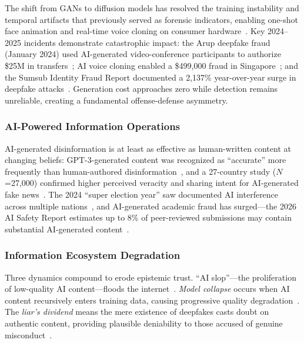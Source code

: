 The shift from GANs to diffusion models has resolved the training instability and temporal artifacts that previously served as forensic indicators, enabling one-shot face animation and real-time voice cloning on consumer hardware~\cite{pei2024deepfakesurvey}. Key 2024--2025 incidents demonstrate catastrophic impact: the Arup deepfake fraud (January 2024) used AI-generated video-conference participants to authorize \$25M in transfers~\cite{wef2025arup}; AI voice cloning enabled a \$499,000 fraud in Singapore~\cite{brightside2025phishing}; and the Sumsub Identity Fraud Report documented a 2,137\% year-over-year surge in deepfake attacks~\cite{sumsub2024}. Generation cost approaches zero while detection remains unreliable, creating a fundamental offense-defense asymmetry.


\subsubsection{AI-Powered Information Operations}
\label{sec:threat-infoop}

AI-generated disinformation is at least as effective as human-written content at changing beliefs: GPT-3-generated content was recognized as ``accurate'' more frequently than human-authored disinformation~\cite{spitale2023gpt3}, and a 27-country study ($N$=27,000) confirmed higher perceived veracity and sharing intent for AI-generated fake news~\cite{stefkovics2026fakenews}. The 2024 ``super election year'' saw documented AI interference across multiple nations~\cite{restofworld2024tracker}, and AI-generated academic fraud has surged---the 2026 AI Safety Report estimates up to 8\% of peer-reviewed submissions may contain substantial AI-generated content~\cite{aisafetyreport2026}.


\subsubsection{Information Ecosystem Degradation}
\label{sec:threat-ecosystem}

Three dynamics compound to erode epistemic trust. ``AI slop''---the proliferation of low-quality AI content---floods the internet~\cite{graphite2025aicontent}. \emph{Model collapse} occurs when AI content recursively enters training data, causing progressive quality degradation~\cite{shumailov2024collapse}. The \emph{liar's dividend} means the mere existence of deepfakes casts doubt on authentic content, providing plausible deniability to those accused of genuine misconduct~\cite{chesney2019deepfakes}.


